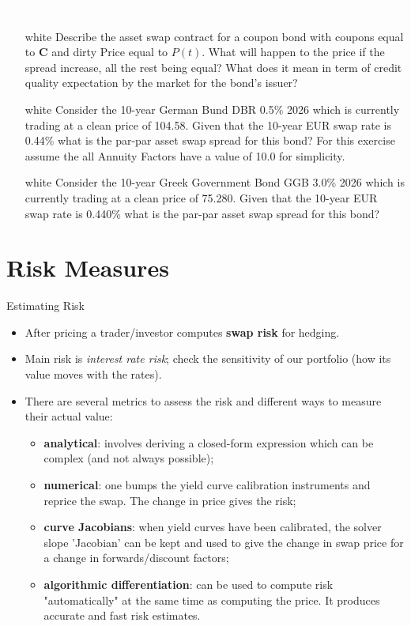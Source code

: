 \documentclass{beamer}
\begin{document}
\begin{homework}
\begin{frame}{\textcolor{white}{Homework}}
\begin{itemize}
\item[white] Describe the asset swap contract for a coupon bond with coupons equal to \textbf{C} and dirty Price equal to $P(t)$. What will happen to the price if the spread increase, all the rest being equal? What does it mean in term of credit quality expectation by the market for the bond's issuer?
\item[white]  Consider the 10-year German Bund DBR 0.5\% 2026 which is currently trading at a clean price of 104.58. 
Given that the 10-year EUR swap rate is 0.44\% what is the par-par asset swap spread for this bond? 
For this exercise assume the all Annuity Factors have a value of 10.0 for simplicity.
\item[white] Consider the 10-year Greek Government Bond GGB 3.0\% 2026 which is currently trading at a clean price of 75.280. Given that the 10-year EUR swap rate is 0.440\% what is the par-par asset swap spread for this bond?
\end{itemize}
\end{frame}
\end{homework}


\section{Risk Measures}
\begin{frame}{Estimating Risk}
\begin{itemize}
\item After pricing a trader/investor computes \textbf{swap risk} for hedging.
\item Main risk is \emph{interest rate risk}; check the sensitivity of our portfolio (how its value moves with the rates).
\item There are several metrics to assess the risk and different ways to measure their actual value:
\begin{itemize}
	\item \textbf{analytical}: involves deriving a closed-form expression which can be complex (and not always possible);
	\item \textbf{numerical}: one bumps the yield curve calibration instruments and reprice the swap. The change in price gives the risk;
	\item \textbf{curve Jacobians}: when yield curves have been calibrated, the solver slope 'Jacobian' can be kept and used to give the change in swap price for a change in forwards/discount factors;
	\item \textbf{algorithmic differentiation}: can be used to compute risk "automatically" at the same time as computing the price. It produces accurate and fast risk estimates.
\end{itemize}
\end{itemize}
\end{frame}
\end{document}
